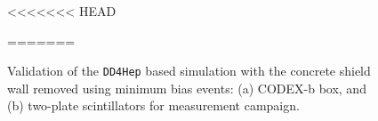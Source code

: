 \begin{figure}
<<<<<<< HEAD
\centering
{}
\caption{
    Validation of the {\tt DD4Hep} based simulation with the concrete shield wall removed using minimum bias events: (a) CODEX-b box, and (b) two-plate scintillators for measurement campaign.}
=======
\centering
{}
\end{figure}
